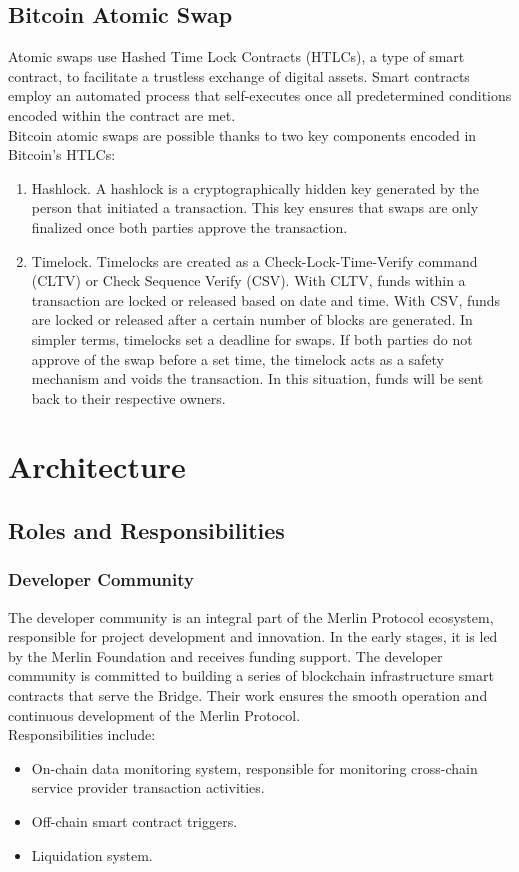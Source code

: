 \documentclass{article}
\begin{document}
\subsection{Bitcoin Atomic Swap}
Atomic swaps use Hashed Time Lock Contracts (HTLCs), a type of smart contract, to facilitate a trustless exchange of digital assets\cite{lamportclocks}. Smart contracts employ an automated process that self-executes once all predetermined conditions encoded within the contract are met.\\
Bitcoin atomic swaps are possible thanks to two key components encoded in Bitcoin’s HTLCs:
\begin{enumerate}
    \item Hashlock. A hashlock is a cryptographically hidden key generated by the person that initiated a transaction. This key ensures that swaps are only finalized once both parties approve the transaction.
    \item Timelock. Timelocks are created as a Check-Lock-Time-Verify command (CLTV) or Check Sequence Verify (CSV). With CLTV, funds within a transaction are locked or released based on date and time. With CSV, funds are locked or released after a certain number of blocks are generated. In simpler terms, timelocks set a deadline for swaps. If both parties do not approve of the swap before a set time, the timelock acts as a safety mechanism and voids the transaction. In this situation, funds will be sent back to their respective owners.
\end{enumerate}
\section{Architecture}
\subsection{Roles and Responsibilities}
\subsubsection{Developer Community}
\par The developer community is an integral part of the Merlin Protocol ecosystem, responsible for project development and innovation. In the early stages, it is led by the Merlin Foundation and receives funding support. The developer community is committed to building a series of blockchain infrastructure smart contracts that serve the Bridge. Their work ensures the smooth operation and continuous development of the Merlin Protocol.\\
Responsibilities include:
\begin{itemize}
    \item On-chain data monitoring system, responsible for monitoring cross-chain service provider transaction activities.
    \item Off-chain smart contract triggers.
    \item Liquidation system.
\end{itemize}
\end{document}

